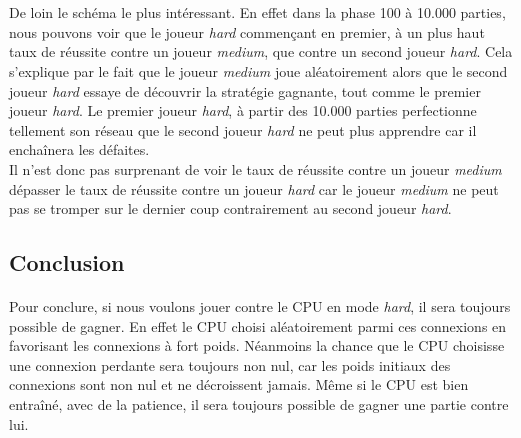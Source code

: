 \documentclass{article}
\begin{document}
  \paragraph{}
    \\
    De loin le schéma le plus intéressant. En effet dans la phase 100 à 10.000 parties, nous pouvons voir que le joueur \emph{hard} commençant en premier, à un plus haut taux de réussite 
    contre un joueur \emph{medium}, que contre un second joueur \emph{hard}.
    Cela s'explique par le fait que le joueur \emph{medium} joue aléatoirement alors que le second joueur \emph{hard}
    essaye de découvrir la stratégie gagnante, tout comme le premier joueur \emph{hard}. Le premier joueur \emph{hard}, à partir des 10.000 parties
    perfectionne tellement son réseau que le second joueur \emph{hard} ne peut plus apprendre car il enchaînera les défaites.\\
    Il n'est donc pas surprenant de voir le taux de réussite contre un joueur \emph{medium} dépasser le taux de réussite contre un joueur \emph{hard} car 
    le joueur \emph{medium} ne peut pas se tromper sur le dernier coup contrairement au second joueur \emph{hard}.

  \subsection{Conclusion}
  \paragraph{}
    Pour conclure, si nous voulons jouer contre le CPU en mode \emph{hard}, il sera toujours possible de gagner.
    En effet le CPU choisi aléatoirement parmi ces connexions en favorisant les connexions à fort poids. 
    Néanmoins la chance que le CPU choisisse une connexion perdante sera toujours non nul, car les poids initiaux des connexions sont non nul et ne décroissent jamais. 
    Même si le CPU est bien entraîné, avec de la patience, il sera toujours possible de gagner une partie contre lui.
\end{document}
